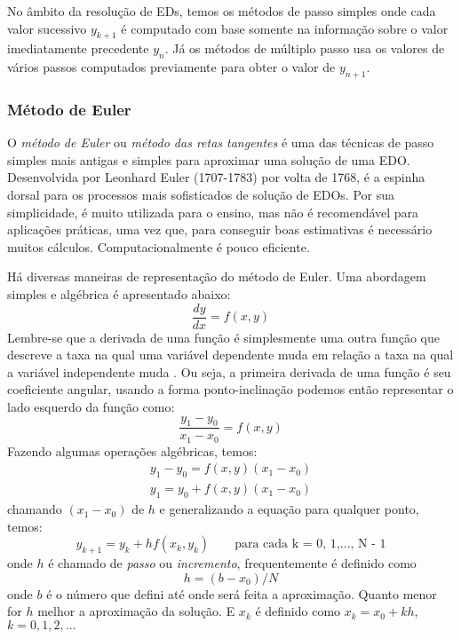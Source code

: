 No âmbito da resolução de EDs, temos os métodos de passo simples onde cada valor
sucessivo $y_{k+1}$ é computado com base somente na informação sobre o valor 
imediatamente precedente $y_{n}$. Já os métodos de múltiplo passo usa os valores
de vários passos computados previamente para obter o valor de $y_{n+1}$.

\subsubsection{Método de Euler}

O \emph{método de Euler} ou \emph{método das retas tangentes}
é uma das técnicas de passo simples  mais antigas e simples para aproximar uma solução 
de uma EDO. Desenvolvida por Leonhard Euler (1707-1783) por volta de 1768, é 
a espinha dorsal para os processos mais sofisticados de solução de EDOs.
Por sua simplicidade, é muito utilizada para o ensino, mas não é recomendável
para aplicações práticas, uma vez que, para conseguir boas estimativas é necessário
muitos cálculos. Computacionalmente é pouco eficiente.

Há diversas maneiras de representação do método de Euler. Uma abordagem simples
e algébrica é apresentado abaixo:
\begin{equation*}
\frac{dy}{dx} = f(x,y)
\end{equation*}
Lembre-se que a derivada de uma função é simplesmente uma outra
função que descreve a taxa na qual uma variável dependente muda em
relação a taxa na qual a variável independente muda \cite[tradução nossa]{thompson}.
Ou seja, a primeira derivada de uma função é seu coeficiente angular, usando a forma 
ponto-inclinação podemos então representar o lado esquerdo da função como:
\begin{equation*}
\frac{y_{1}-y_{0}}{x_{1}-x_{0}} = f(x,y)
\end{equation*}
Fazendo algumas operações algébricas, temos:
\begin{equation*}
\begin{split}
y_{1}-y_{0} = f(x,y)(x_{1}-x_{0})\\
y_{1} = y_{0} + f(x,y)(x_{1}-x_{0})
\end{split}
\end{equation*}
chamando $(x_{1}-x_{0})$ de $h$ e generalizando a equação para qualquer ponto, temos:
\begin{equation}
y_{k+1} = y_{k} + hf(x_{k},y_{k})
\qquad \text{para cada k = 0, 1,$\dotsc$, N - 1}
\label{euler}
\end{equation}
onde $h$ é chamado de \emph{passo} ou \emph{incremento}, frequentemente é definido como 
\begin{equation*}
h = (b-x_{0})/N
\end{equation*}
onde $b$ é o número que defini até onde será feita a aproximação. Quanto menor for $h$ melhor a 
aproximação da solução. E $x_{k}$ é definido como $x_{k} = x_{0}+kh$, $k = 0, 1, 2,\dotsc$

